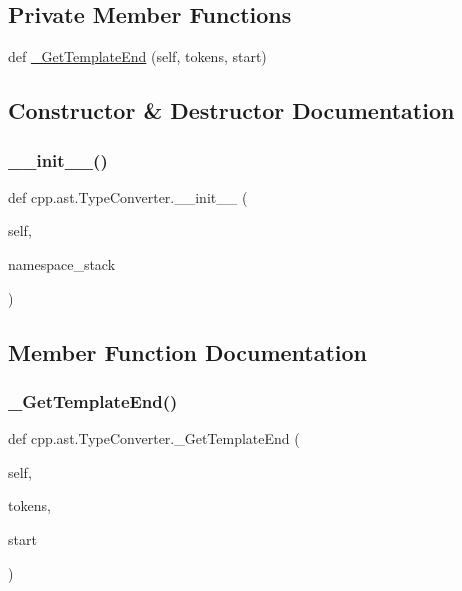 \subsection*{Private Member Functions}
\begin{DoxyCompactItemize}
\item 
def \mbox{\hyperlink{classcpp_1_1ast_1_1_type_converter_adcf38788abb48f32f4a63eb091b3d53a}{\+\_\+\+Get\+Template\+End}} (self, tokens, start)
\end{DoxyCompactItemize}


\subsection{Constructor \& Destructor Documentation}
\mbox{\label{classcpp_1_1ast_1_1_type_converter_ae6e75773d6722cdbb96d510a49cb633a}} 
\subsubsection{\texorpdfstring{\_\_init\_\_()}{\_\_init\_\_()}}
{\footnotesize\ttfamily def cpp.\+ast.\+Type\+Converter.\+\_\+\+\_\+init\+\_\+\+\_\+ (\begin{DoxyParamCaption}\item[{}]{self,  }\item[{}]{namespace\+\_\+stack }\end{DoxyParamCaption})}



\subsection{Member Function Documentation}
\mbox{\label{classcpp_1_1ast_1_1_type_converter_adcf38788abb48f32f4a63eb091b3d53a}} 
\subsubsection{\texorpdfstring{\_GetTemplateEnd()}{\_GetTemplateEnd()}}
{\footnotesize\ttfamily def cpp.\+ast.\+Type\+Converter.\+\_\+\+Get\+Template\+End (\begin{DoxyParamCaption}\item[{}]{self,  }\item[{}]{tokens,  }\item[{}]{start }\end{DoxyParamCaption})\hspace{0.3cm}{\ttfamily [private]}}

